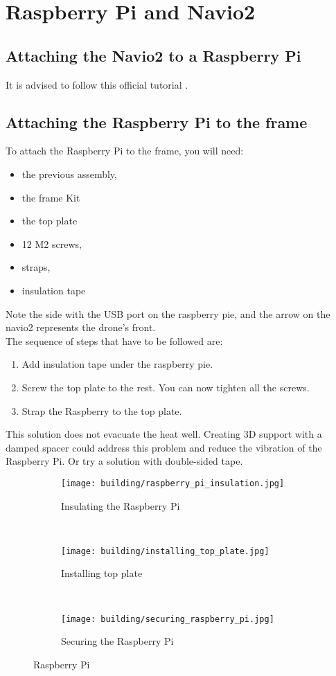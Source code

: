 \section{Raspberry Pi and Navio2}
\subsection{Attaching the Navio2 to a Raspberry Pi}
It is advised to follow this official tutorial \cite{emlid_hardware_setup}.

\subsection{Attaching the Raspberry Pi to the frame}
To attach the Raspberry Pi to the frame, you will need:
\begin{itemize}
    \item the previous assembly,
    \item the frame Kit
    \item the top plate
    \item 12 M2 screws,
    \item straps,
    \item insulation tape
\end{itemize}
Note the side with the USB port on the raspberry pie, and the arrow on the navio2 represents the drone's front.\\
The sequence of steps that have to be followed are:
\begin{enumerate}
    \item Add insulation tape under the raspberry pie.
    \item Screw the top plate to the rest. You can now tighten all the screws.
    \item Strap the Raspberry to the top plate.
\end{enumerate}

This solution does not evacuate the heat well. Creating 3D support with a damped spacer could address this problem and reduce the vibration of the Raspberry Pi. Or try a solution with double-sided tape.

\begin{figure}[!ht]
    \centering
    \begin{subfigure}[b]{0.3\textwidth}
        \texttt{[image: building/raspberry\_pi\_insulation.jpg]}
        \caption{Insulating the Raspberry Pi}
        \label{fig:rpi_insulation}
    \end{subfigure}
    ~
    \begin{subfigure}[b]{0.3\textwidth}
        \texttt{[image: building/installing\_top\_plate.jpg]}
        \caption{Installing top plate}
        \label{fig:install_top_plate}
    \end{subfigure}
    ~
    \begin{subfigure}[b]{0.3\textwidth}
        \texttt{[image: building/securing\_raspberry\_pi.jpg]}
        \caption{Securing the Raspberry Pi}
        \label{fig:rpi_secure}
    \end{subfigure}
    \caption{Raspberry Pi}\label{fig:rpi}
\end{figure}

